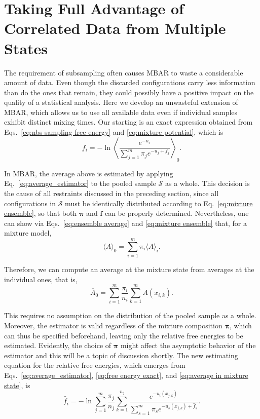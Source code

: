 \documentclass[aip,jcp,reprint,amsmath,amssymb]{revtex4-1}
\newcommand{\vt}[1]{\boldsymbol{\mathbf{#1}}}           %
\begin{document}
\section{Taking Full Advantage of Correlated Data from Multiple States}

The requirement of subsampling often causes MBAR to waste a considerable amount of data. Even though the discarded configurations carry less information than do the ones that remain, they could possibly have a positive impact on the quality of a statistical analysis. Here we develop an unwasteful extension of MBAR, which allows us to use all available data even if individual samples exhibit distinct mixing times. Our starting is an exact expression obtained from Eqs.~\eqref{eq:nbs sampling free energy} and \eqref{eq:mixture potential}, which is
\begin{equation}
\label{eq:free energy exact}
f_i = -\ln \left\langle \frac{e^{-u_i}}{\sum_{j=1}^m \pi_j e^{-u_j + f_j}} \right\rangle_0.
\end{equation}

In MBAR, the average above is estimated by applying Eq.~\eqref{eq:average_estimator} to the pooled sample $\mathcal S$ as a whole. This decision is the cause of all restraints discussed in the preceding section, since all configurations in $\mathcal S$ must be identically distributed according to Eq.~\eqref{eq:mixture ensemble}, so that both $\vt \pi$ and $\vt f$ can be properly determined. Nevertheless, one can show via Eqs.~\eqref{eq:ensemble average} and \eqref{eq:mixture ensemble} that, for a mixture model,
\begin{equation}
\label{eq:average in mixture state}
\langle A \rangle_0 = \sum_{i=1}^m \pi_i \langle A \rangle_i.
\end{equation}

Therefore, we can compute an average at the mixture state from averages at the individual ones, that is,
\begin{equation}
\label{eq:average estimator in mixture state}
{\overline A}_0 = \sum_{i=1}^m \frac{\pi_i}{n_i} \sum_{k=1}^m A(x_{i,k}).
\end{equation}

This requires no assumption on the distribution of the pooled sample as a whole. Moreover, the estimator is valid regardless of the mixture composition $\vt \pi$, which can thus be specified beforehand, leaving only the relative free energies to be estimated. Evidently, the choice of $\vt \pi$ might affect the asymptotic behavior of the estimator and this will be a topic of discussion shortly. The new estimating equation for the relative free energies, which emerges from Eqs.~\eqref{eq:average_estimator}, \eqref{eq:free energy exact}, and \eqref{eq:average in mixture state}, is
\begin{equation}
\label{eq:mblock free energy estimator}
{\hat f}_i = -\ln \sum_{j=1}^m \frac{\pi_j}{n_j} \sum_{k=1}^{n_j} \frac{e^{-u_i(x_{j,k})}}{\sum_{s=1}^m \pi_s e^{-u_s(x_{j,k}) + {\hat f}_s}}.
\end{equation}
\end{document}

